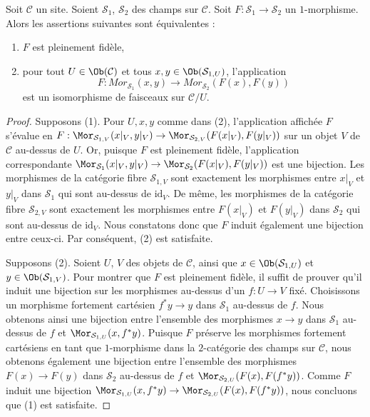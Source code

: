 \begin{lemma}
\label{lemma-characterize-ff}
Soit $\mathcal{C}$ un site.
Soient $\mathcal{S}_1$, $\mathcal{S}_2$ des champs sur $\mathcal{C}$.
Soit $F : \mathcal{S}_1 \to \mathcal{S}_2$ un $1$-morphisme.
Alors les assertions suivantes sont équivalentes :
\begin{enumerate}
\item $F$ est pleinement fidèle,
\item pour tout $U \in \Ob(\mathcal{C})$ et tous
$x, y \in \Ob(\mathcal{S}_{1, U})$, l'application
$$
F :
\mathit{Mor}_{\mathcal{S}_1}(x, y)
\longrightarrow
\mathit{Mor}_{\mathcal{S}_2}(F(x), F(y))
$$
est un isomorphisme de faisceaux sur $\mathcal{C}/U$.
\end{enumerate}
\end{lemma}

\begin{proof}
Supposons (1). Pour $U, x, y$ comme dans (2), l'application affichée $F$ s'évalue en
$F : \Mor_{\mathcal{S}_{1, V}}(x|_V, y|_V) \to
\Mor_{\mathcal{S}_{2, V}}(F(x|_V), F(y|_V))$
sur un objet $V$ de $\mathcal{C}$ au-dessus de $U$.
Or, puisque $F$ est pleinement fidèle, l'application correspondante
$\Mor_{\mathcal{S}_1}(x|_V, y|_V) \to \Mor_{\mathcal{S}_2}(F(x|_V), F(y|_V))$
est une bijection. Les morphismes de la catégorie fibre $\mathcal{S}_{1, V}$ sont
exactement les morphismes entre $x|_V$ et $y|_V$ dans $\mathcal{S}_1$ qui sont
au-dessus de $\text{id}_V$. De même, les morphismes de la catégorie fibre
$\mathcal{S}_{2, V}$ sont exactement les morphismes entre $F(x|_V)$ et
$F(y|_V)$ dans $\mathcal{S}_2$ qui sont au-dessus de $\text{id}_V$. Nous constatons donc que $F$
induit également une bijection entre ceux-ci. Par conséquent, (2) est satisfaite.

\medskip\noindent
Supposons (2). Soient $U$, $V$ des objets de $\mathcal{C}$, ainsi que
$x \in \Ob(\mathcal{S}_{1, U})$ et
$y \in \Ob(\mathcal{S}_{1, V})$. Pour montrer que $F$ est pleinement fidèle,
il suffit de prouver qu'il induit une bijection sur les
morphismes au-dessus d'un $f : U \to V$ fixé. Choisissons un morphisme fortement cartésien
$f^*y \to y$ dans $\mathcal{S}_1$ au-dessus de $f$. Nous obtenons ainsi une
bijection entre l'ensemble des morphismes $x \to y$ dans $\mathcal{S}_1$ au-dessus
de $f$ et $\Mor_{\mathcal{S}_{1, U}}(x, f^*y)$. Puisque $F$ préserve
les morphismes fortement cartésiens en tant que $1$-morphisme dans la $2$-catégorie
des champs sur $\mathcal{C}$, nous obtenons également une bijection
entre l'ensemble des morphismes $F(x) \to F(y)$ dans $\mathcal{S}_2$ au-dessus
de $f$ et $\Mor_{\mathcal{S}_{2, U}}(F(x), F(f^*y))$.
Comme $F$ induit une bijection
$\Mor_{\mathcal{S}_{1, U}}(x, f^*y) \to
\Mor_{\mathcal{S}_{2, U}}(F(x), F(f^*y))$,
nous concluons que (1) est satisfaite.
\end{proof}

